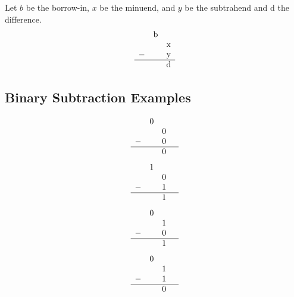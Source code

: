 \documentclass[12pt,openany]{book}
\begin{document}
			      	Let $b$ be the borrow-in, $x$ be the minuend, and $y$ be the subtrahend and d the difference. 
			      	\[
			      		\begin{array}{cccccc}
			      			&$b$ \\
			      			  &   & $x$ \\
			      			- &   & $y$ \\
			      			\hline
			      			  &   & $d$ \\
			      		\end{array}
			      	\]
			      	
			      	\subsection{Binary Subtraction Examples}
			      	
			      	
			      	
			      	\[
			      		\begin{array}{cccc}
			      			&0 & \\
			      			  &   & 0 &   \\
			      			- &   & 0 &   \\
			      			\hline
			      			  &   & 0 &   \\
			      		\end{array}
			      	\]
			      	\[
			      		\begin{array}{cccc}
			      			&1 & \\
			      			  &   & 0 &   \\
			      			- &   & 1 &   \\
			      			\hline
			      			  &   & 1 &   \\
			      		\end{array}
			      	\]
			      	\[
			      		\begin{array}{cccc}
			      			& 0 & \\
			      			  &   & 1 &   \\
			      			- &   & 0 &   \\
			      			\hline
			      			  &   & 1 &   \\
			      		\end{array}
			      	\]
			      	\[
			      		\begin{array}{cccc}
			      			& 0 & \\
			      			  &   & 1 &   \\
			      			- &   & 1 &   \\
			      			\hline
			      			  &   & 0 &   \\
			      		\end{array}
			      	\]
			      	
\end{document}

